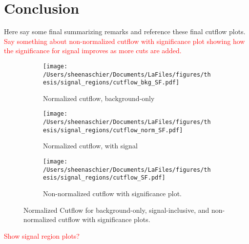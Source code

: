  \begin{table}[]
 \tiny
\centering
{}
\end{table}

\section{Conclusion}
Here say some final summarizing remarks and reference these final cutflow plots.  \textcolor{red}{Say something about non-normalized cutflow with significance plot showing how the significance for signal improves as more cuts are added.}

\begin{figure}[h!]
\centering
\begin{subfigure}[b]{0.47\textwidth}
\texttt{[image: /Users/sheenaschier/Documents/LaFiles/figures/thesis/signal\_regions/cutflow\_bkg\_SF.pdf]}
\caption{Normalized cutflow, background-only}
\end{subfigure}
 \begin{subfigure}[b]{0.47\textwidth}
\texttt{[image: /Users/sheenaschier/Documents/LaFiles/figures/thesis/signal\_regions/cutflow\_norm\_SF.pdf]}
 \caption{Normalized cutflow, with signal}
\end{subfigure}
\begin{subfigure}[b]{0.58\textwidth}
\texttt{[image: /Users/sheenaschier/Documents/LaFiles/figures/thesis/signal\_regions/cutflow\_SF.pdf]}
 \caption{Non-normalized cutflow with significance plot.}
\end{subfigure}

 \caption{Normalized Cutflow for background-only, signal-inclusive, and  non-normalized cutflow with significance plots. }
 \label{fig:cutflow_norm}
\end{figure}

\textcolor{red}{Show signal region plots?}




